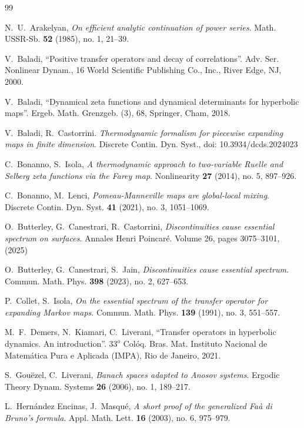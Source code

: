 \documentclass[11pt]{amsart}
\theoremstyle{definition}
\theoremstyle{remark}
\theoremstyle{definition}
\numberwithin{equation}{section}
\begin{document}
\begin{thebibliography}{99}

 N.~U.~Arakelyan, \emph{On efficient analytic continuation of power series}. Math. USSR-Sb. \textbf{52} (1985), no. 1, 21--39.

 V.~Baladi, ``Positive transfer operators and decay of correlations''. Adv. Ser. Nonlinear Dynam., 16 World Scientific Publishing Co., Inc., River Edge, NJ, 2000.

 V.~Baladi, ``Dynamical zeta functions and dynamical determinants for hyperbolic maps''. Ergeb. Math. Grenzgeb. (3), 68, Springer, Cham, 2018.

 	V.~Baladi, R.~Castorrini. \emph{Thermodynamic formalism for piecewise expanding maps in finite dimension}. Discrete Contin. Dyn. Syst., doi: 10.3934/dcds.2024023

 C.~Bonanno, S.~Isola, \emph{A thermodynamic approach to two-variable Ruelle and Selberg zeta functions via the Farey map}. Nonlinearity {\bf 27} (2014), no. 5, 897--926.

 C.~Bonanno, M.~Lenci, \emph{Pomeau-Manneville maps are global-local mixing}. Discrete Contin. Dyn. Syst. \textbf{41} (2021), no. 3, 1051--1069.

 O.~Butterley, G.~Canestrari, R.~Castorrini, \emph{Discontinuities cause essential spectrum on surfaces}. Annales Henri Poincar\'e.  Volume 26, pages 3075–3101, (2025)


 O.~Butterley, G.~Canestrari, S.~Jain, \emph{Discontinuities cause essential spectrum}. Commun. Math. Phys. \textbf{398} (2023), no. 2, 627--653.

 P.~Collet, S.~Isola, \emph{On the essential spectrum of the transfer operator for expanding Markov maps}. Commun. Math. Phys. \textbf{139} (1991), no. 3, 551--557.

  M.~F.~Demers, N.~Kiamari, C.~Liverani, ``Transfer operators in hyperbolic dynamics. An introduction''. $33^o$  Col\'oq. Bras. Mat. Instituto Nacional de Matem\'atica Pura e Aplicada (IMPA), Rio de Janeiro, 2021.

 S.~Gou\"ezel, C.~Liverani, \emph{Banach spaces adapted to Anosov systems}. Ergodic Theory Dynam. Systems \textbf{26} (2006), no. 1, 189--217.

  L.~Hern\'andez Encinas, J.~Masqu\'e, \emph{A short proof of the generalized Fa\`a di Bruno's formula}. Appl. Math. Lett. \textbf{16} (2003), no. 6, 975--979.


\end{thebibliography}
\end{document}
